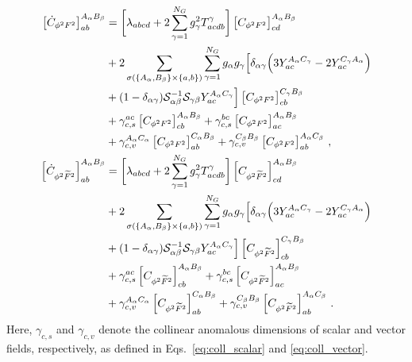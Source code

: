 \begin{align}
     \left[\dot{C}_{\phi^2 F^2}\right]_{ab}^{A_\alpha B_\beta} &= \bigg[\lambda_{abcd}+2\sum_{\gamma=1}^{N_G} g_\gamma^2T^\gamma_{a c d b} \bigg]\left[C_{\phi^2 F^2}\right]_{c d}^{A_\alpha B_\beta}\nonumber\\
    & +2\sum_{\sigma(\{A_\alpha ,B_\beta\}\times \{a , b\})}\sum_{\gamma=1}^{N_G}g_\alpha g_\gamma\Big[ \delta_{\alpha\gamma}\Big(3Y_{ac}^{A_\alpha C_\gamma}-2Y_{ac}^{C_\gamma A_\alpha}\Big) \nonumber\\
    & +(1-\delta_{\alpha\gamma}) \mathcal S_{\alpha\beta}^{-1} \mathcal{S}_{\gamma\beta}  Y_{ac }^{A_\alpha C_\gamma}   \Big]\left[C_{\phi^2 F^2}\right]_{cb}^{C_\gamma B_\beta}\nonumber\\
    & +\gamma_{c,s}^{ac}\left[ C_{\phi^2  F^2}\right]_{cb}^{A_\alpha B_\beta} +\gamma_{c,s}^{bc}\left[ C_{\phi^2  F^2}\right]_{ac}^{A_\alpha B_\beta}\nonumber\\
    &+\gamma^{A_\alpha C_\alpha}_{c,v}\left[ C_{\phi^2  F^2}\right]_{ab}^{C_\alpha B_\beta} + \gamma^{C_\beta B_\beta}_{c,v}\left[ C_{\phi^2  F^2}\right]_{ab}^{A_\alpha C_\beta}\,,
    \label{eq:phi2F2_phi2F2}
\\
     \left[\dot{ C}_{\phi^2 \widetilde F^2}\right]_{ab}^{A_\alpha B_\beta} &= \bigg[\lambda_{abcd}+2\sum_{\gamma=1}^{N_G} g_\gamma^2T^\gamma_{a c d b}\bigg]\left[ C_{\phi^2 \widetilde F^2}\right]_{c d}^{A_\alpha B_\beta}\nonumber\\
    & +2\sum_{\sigma(\{A_\alpha ,B_\beta\}\times \{a , b\})}\sum_{\gamma=1}^{N_G}g_\alpha g_\gamma\Big[ \delta_{\alpha\gamma}\Big(3Y_{ac}^{A_\alpha C_\gamma}-2Y_{ac}^{C_\gamma A_\alpha}\Big) \nonumber\\
    & +(1-\delta_{\alpha\gamma}) \mathcal S_{\alpha\beta}^{-1} \mathcal{S}_{\gamma\beta}  Y_{ac }^{A_\alpha C_\gamma}   \Big]\left[ C_{\phi^2 \widetilde F^2}\right]_{cb}^{C_\gamma B_\beta}\nonumber\\
    & +\gamma_{c,s}^{ac}\left[ C_{\phi^2  \widetilde{F}^2}\right]_{cb}^{A_\alpha B_\beta} +\gamma_{c,s}^{bc}\left[ C_{\phi^2  \widetilde{F}^2}\right]_{ac}^{A_\alpha B_\beta}\nonumber\\
    &+\gamma^{A_\alpha C_\alpha}_{c,v}\left[ C_{\phi^2  \widetilde{F}^2}\right]_{ab}^{C_\alpha B_\beta} + \gamma^{C_\beta B_\beta}_{c,v}\left[ C_{\phi^2  \widetilde{F}^2}\right]_{ab}^{A_\alpha C_\beta}\,.
\end{align}
Here, $\gamma_{c,s}$ and $\gamma_{c,v}$ denote the collinear anomalous dimensions of scalar and vector fields, respectively, as defined in Eqs.~\eqref{eq:coll_scalar} and \eqref{eq:coll_vector}.


